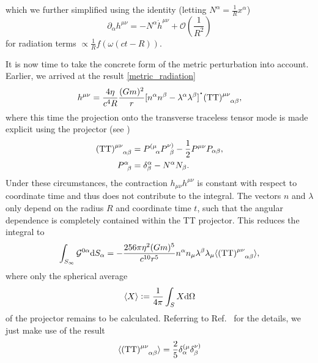 which we further simplified using the identity (letting $N^\alpha = \frac{1}{R}x^\alpha$)
\begin{equation}
  \partial_\alpha h^{\mu\nu} = -N^\alpha \dot h^{\mu\nu} + \mathcal O\left(\frac{1}{R^2}\right)
\end{equation}
for radiation terms $\propto\frac{1}{R}f(\omega(ct-R))$.

It is now time to take the concrete form of the metric perturbation into account. Earlier, we arrived at the result \eqref{metric_radiation}
\begin{equation}
  h^{\mu\nu} = \frac{4\eta}{c^4 R}\frac{(Gm)^2}{r}\lbrack n^\alpha n^\beta-\lambda^\alpha\lambda^\beta\rbrack^{\scalebox{1.5}{$\cdot$}} (\mathrm{TT})^{\mu\nu}_{\hphantom{\mu\nu}\alpha\beta},
\end{equation}
where this time the projection onto the transverse traceless tensor mode is made explicit using the projector (see \cite{poisson2014gravity})
\begin{equation}
  \begin{aligned}
    (\mathrm{TT})^{\mu\nu}_{\hphantom{\mu\nu}\alpha\beta} = {} & P^{(\mu}_{\hphantom{(\mu}\alpha} P^{\nu)}_{\hphantom{\nu}\beta} - \frac{1}{2} P^{\mu\nu} P_{\alpha\beta}, \\
    P^{\alpha}_{\hphantom{\alpha}\beta} = {} & \delta^\alpha_\beta - N^\alpha N_\beta.
  \end{aligned}
\end{equation}
Under these circumstances, the contraction $h_{\mu\nu} h^{\mu\nu}$ is constant with respect to coordinate time and thus does not contribute to the integral. The vectors $n$ and $\lambda$ only depend on the radius $R$ and coordinate time $t$, such that the angular dependence is completely contained within the TT projector. This reduces the integral to
\begin{equation}
  \int_{S_\infty}\mathcal G^{0\alpha}\mathrm dS_\alpha = -\frac{256\pi\eta^2(Gm)^5}{c^{10}r^5} n^\alpha n_\mu \lambda^\beta \lambda_\mu \langle(\mathrm{TT})^{\mu\nu}_{\hphantom{\mu\nu}\alpha\beta}\rangle,
\end{equation}
where only the spherical average
\begin{equation}
  \langle X\rangle \vcentcolon= \frac{1}{4\pi}\int_S X \mathrm d\Omega
\end{equation}
of the projector remains to be calculated. Referring to Ref.~\cite{poisson2014gravity} for the details, we just make use of the result
\begin{equation}
  \langle(\mathrm{TT})^{\mu\nu}_{\hphantom{\mu\nu}\alpha\beta}\rangle = \frac{2}{5} \delta^{(\mu}_\alpha\delta^{\nu)}_\beta
\end{equation}
